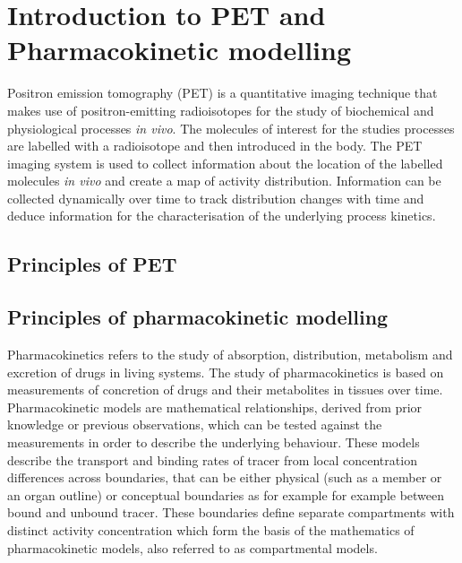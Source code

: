 \chapter{Introduction to PET and Pharmacokinetic modelling}

Positron emission tomography (PET) is a quantitative imaging technique that makes use of 
positron-emitting radioisotopes for the study of biochemical and physiological processes \textit{in vivo}. The molecules of interest for the studies processes are labelled with a radioisotope and then introduced in the body. The PET imaging system is used to collect information about the location of the labelled molecules \textit{in vivo} and create a map of activity distribution. Information can be collected dynamically over time to track distribution changes with time and deduce information for the characterisation of the underlying process kinetics. 
\section{Principles of PET}

\section{Principles of pharmacokinetic modelling}
Pharmacokinetics refers to the study of absorption, distribution, metabolism and excretion of drugs in living systems. The study of pharmacokinetics is based on measurements of concretion of drugs and their metabolites in tissues over time. Pharmacokinetic models are mathematical relationships, derived from prior knowledge or previous observations, which can be tested against the measurements in order to describe the underlying behaviour. These models describe the transport and binding rates of tracer from local concentration differences across boundaries, that can be either physical (such as a member or an organ outline) or conceptual boundaries as for example for example between bound and unbound tracer. These boundaries define separate compartments with distinct activity concentration which form the basis of the mathematics of pharmacokinetic models, also referred to as compartmental models.\par

